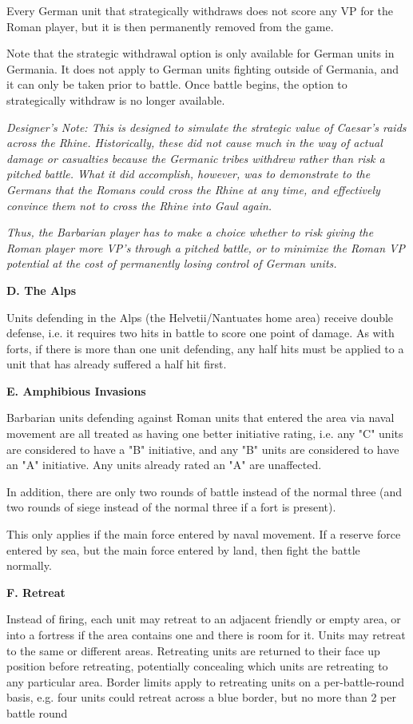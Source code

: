 Every German unit that strategically withdraws does not score any VP for the Roman player, but it is then permanently removed from the game.

Note that the strategic withdrawal option is only available for German units in Germania. It does not apply to German units fighting outside of Germania, and it can only be taken prior to battle. Once battle begins, the option to strategically withdraw is no longer available.

\textit{Designer's Note: This is designed to simulate the strategic value of Caesar's raids across the Rhine. Historically, these did not cause much in the way of actual damage or casualties because the Germanic tribes withdrew rather than risk a pitched battle. What it did accomplish, however, was to demonstrate to the Germans that the Romans could cross the Rhine at any time, and effectively convince them not to cross the Rhine into Gaul again.}
\par
\textit{Thus, the Barbarian player has to make a choice whether to risk giving the Roman player more VP's through a pitched battle, or to minimize the Roman VP potential at the cost of permanently losing control of German units.}

\textbf{D. The Alps}
\par
Units defending in the Alps (the Helvetii/Nantuates home area) receive double defense, i.e. it requires two hits in battle to score one point of damage. As with forts, if there is more than one unit defending, any half hits must be applied to a unit that has already suffered a half hit first.

\textbf{E. Amphibious Invasions}
\par
Barbarian units defending against Roman units that entered the area via naval movement are all treated as having one better initiative rating, i.e. any "C" units are considered to have a "B" initiative, and any "B" units are considered to have an "A" initiative. Any units already rated an "A" are unaffected.

In addition, there are only two rounds of battle instead of the normal three (and two rounds of siege instead of the normal three if a fort is present).

This only applies if the main force entered by naval movement. If a reserve force entered by sea, but the main force entered by land, then fight the battle normally.

\textbf{F. Retreat}
\par
Instead of firing, each unit may retreat to an adjacent friendly or empty area, or into a fortress if the area contains one and there is room for it. Units may retreat to the same or different areas. Retreating units are returned to their face up position before retreating, potentially concealing which units are retreating to any particular area. Border limits apply to retreating units on a per-battle-round basis, e.g. four units could retreat across a blue border, but no more than 2 per battle round

